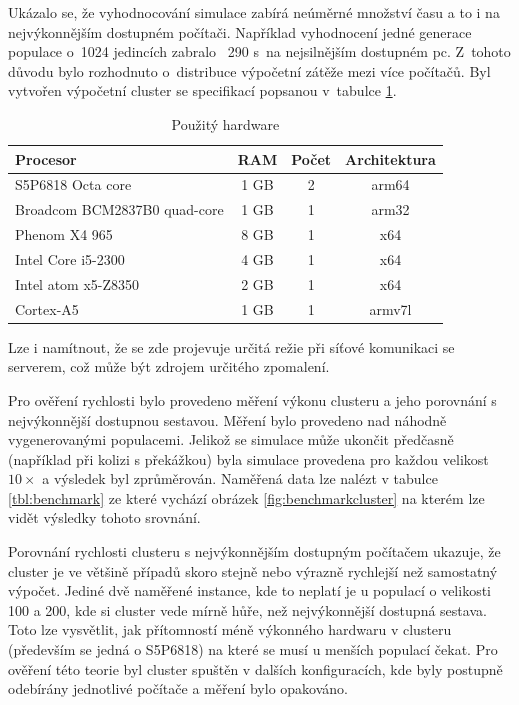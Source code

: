 \label{sec:cluster}
Ukázalo se, že vyhodnocování simulace zabírá neúměrné množství času a to i na nejvýkonnějším dostupném počítači. 
Například vyhodnocení jedné generace populace o~1024 jedincích zabralo ~290 s~na nejsilnějším dostupném pc. Z~tohoto důvodu bylo rozhodnuto o~distribuce výpočetní zátěže mezi více počítačů. Byl vytvořen výpočetní cluster se specifikací popsanou v~tabulce \ref{table:hw_table}.
\begin{table}[h!]
	\centering
	\begin{tabular}{|l|c|c|c|}
		\hline 
		Procesor & RAM & Počet & Architektura\\ 
		\hline 
		S5P6818 Octa core & 1 GB & 2 & arm64 \\ 
		\hline 
		Broadcom BCM2837B0 quad-core & 1 GB & 1 & arm32 \\ 
		\hline 
		Phenom X4 965 & 8 GB & 1 & x64 \\ 
		\hline
		Intel Core i5-2300 & 4 GB & 1 & x64 \\ 
		\hline 
		Intel atom x5-Z8350 & 2 GB & 1 & x64 \\ 
		\hline
		Cortex-A5 & 1 GB & 1 & armv7l \\
		\hline
	\end{tabular} 
	\caption{Použitý hardware}
	\label{table:hw_table}
	
\end{table}
Lze i namítnout, že se zde projevuje určitá režie při síťové komunikaci se serverem, což může být zdrojem určitého zpomalení.

Pro ověření rychlosti bylo provedeno měření výkonu clusteru a jeho porovnání s nejvýkonnější dostupnou sestavou. Měření bylo provedeno nad náhodně vygenerovanými populacemi. Jelikož se simulace může ukončit předčasně (například při kolizi s překážkou) byla simulace provedena pro každou velikost $10\times$ a výsledek byl zprůměrován. Naměřená data lze nalézt v tabulce \ref{tbl:benchmark} ze které vychází obrázek \ref{fig:benchmarkcluster} na kterém lze vidět výsledky tohoto srovnání. 

Porovnání rychlosti clusteru s nejvýkonnějším dostupným počítačem ukazuje, že cluster je ve většině případů skoro stejně nebo  výrazně rychlejší než samostatný výpočet. Jediné dvě naměřené instance, kde to neplatí je u populací o velikosti 100 a 200, kde si cluster vede mírně hůře, než nejvýkonnější dostupná sestava. 
Toto lze vysvětlit, jak přítomností méně výkonného hardwaru v clusteru (především se jedná o S5P6818) na které se musí u menších populací čekat. Pro ověření této teorie byl cluster spuštěn v dalších konfiguracích, kde byly postupně odebírány jednotlivé počítače a měření bylo opakováno. 

